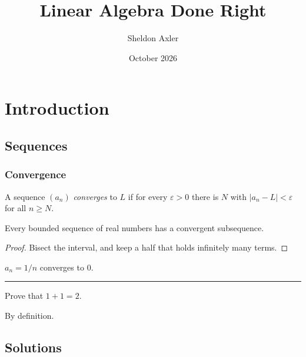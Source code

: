 \documentclass[9pt,openany,oneside]{book}
\title{Linear Algebra Done Right}
\author{Sheldon Axler}
\date{October 2026}
\begin{document}
\maketitle
\tableofcontents

\part{Introduction}
\chapter{Sequences}

\section{Convergence}
\begin{definition}
A sequence $(a_n)$ \emph{converges} to $L$ if for every $\varepsilon>0$
there is $N$ with $|a_n-L|<\varepsilon$ for all $n\ge N$.
\end{definition}
\begin{theorem}
Every bounded sequence of real numbers has a convergent subsequence.
\end{theorem}
\begin{proof}
Bisect the interval, and keep a half that holds infinitely many terms.
\end{proof}
\begin{example}
$a_n=1/n$ converges to $0$.
\end{example}

\begin{fullwidth}
\centering\rule{0pt}{25mm}\rule{150mm}{0pt}
\end{fullwidth}

\begin{exercise}
Prove that $1+1=2$.
\end{exercise}
\begin{solution}
By definition.
\end{solution}

\chapter{Solutions}
\printsolutionsbysection
\end{document}
